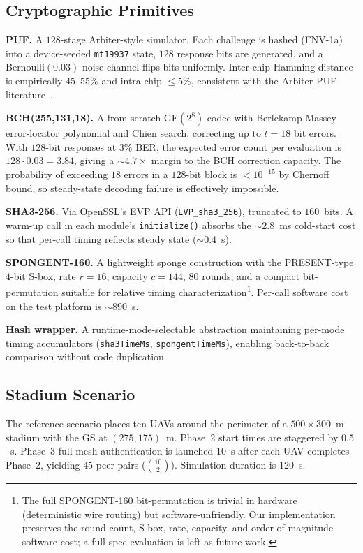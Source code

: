 \documentclass[conference,a4paper,10pt]{IEEEtran}
\begin{document}
\subsection{Cryptographic Primitives}
\textbf{PUF.} A $128$-stage Arbiter-style simulator. Each challenge
is hashed (FNV-1a) into a device-seeded \texttt{mt19937} state, $128$
response bits are generated, and a Bernoulli$(0.03)$ noise channel
flips bits uniformly. Inter-chip Hamming distance is empirically
$45$--$55\%$ and intra-chip $\le 5\%$, consistent with the Arbiter
PUF literature~\cite{arbiter_puf_iot}.

\textbf{BCH(255,131,18).} A from-scratch GF$(2^8)$ codec with
Berlekamp-Massey error-locator polynomial and Chien search,
correcting up to $t{=}18$ bit errors. With $128$-bit responses at
$3\%$ BER, the expected error count per evaluation is
$128{\cdot}0.03{=}3.84$, giving a $\sim 4.7\times$ margin to the BCH
correction capacity. The probability of exceeding $18$ errors in a
$128$-bit block is $<\!10^{-15}$ by Chernoff bound, so steady-state
decoding failure is effectively impossible.

\textbf{SHA3-256.} Via OpenSSL's EVP API (\texttt{EVP\_sha3\_256}),
truncated to $160$~bits. A warm-up call in each module's
\texttt{initialize()} absorbs the $\sim$2.8~ms cold-start cost so
that per-call timing reflects steady state ($\sim$0.4~\textmu s).

\textbf{SPONGENT-160.} A lightweight sponge construction with the
PRESENT-type $4$-bit S-box, rate $r{=}16$, capacity $c{=}144$,
$80$ rounds, and a compact bit-permutation suitable for relative
timing characterization\footnote{The full SPONGENT-160 bit-permutation
is trivial in hardware (deterministic wire routing) but
software-unfriendly. Our implementation preserves the round count,
S-box, rate, capacity, and order-of-magnitude software cost; a
full-spec evaluation is left as future work.}. Per-call software cost
on the test platform is $\sim$890~\textmu s.

\textbf{Hash wrapper.} A runtime-mode-selectable abstraction
maintaining per-mode timing accumulators
(\texttt{sha3TimeMs}, \texttt{spongentTimeMs}), enabling back-to-back
comparison without code duplication.

\subsection{Stadium Scenario}
The reference scenario places ten UAVs around the perimeter of a
$500{\times}300$~m stadium with the GS at $(275, 175)$~m.
Phase~2 start times are staggered by $0.5$~s. Phase~3 full-mesh
authentication is launched $10$~s after each UAV completes Phase~2,
yielding $45$ peer pairs ($\binom{10}{2}$). Simulation duration is
$120$~s.
\end{document}
